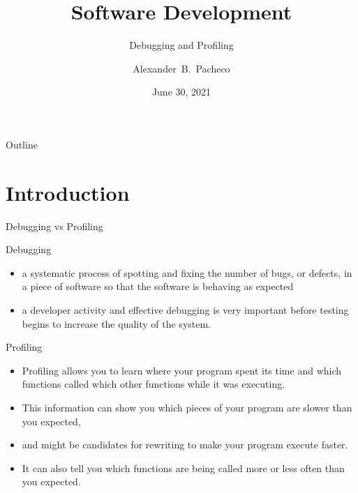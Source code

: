 \documentclass[10pt,t]{beamer}
\title{Software Development}
\subtitle{Debugging and Profiling}
\author[Alex Pacheco]{\large{Alexander~B.~Pacheco}}
\institute{\href{http://researchcomputing.lehigh.edu}{Research Computing}}
\date{June 30, 2021}
\begin{document}
\frame{\titlepage}

\begin{frame}{Outline}
  \tableofcontents
\end{frame}

\section{Introduction}
\begin{frame}{Debugging vs Profiling}
  \begin{eblock}{Debugging}
    \begin{itemize}
    \item a systematic process of spotting and fixing the number of bugs, or defects, in a piece of software so that the software is behaving as expected
    \item a developer activity and effective debugging is very important before testing begins to increase the quality of the system.
    \end{itemize}
  \end{eblock}

  \begin{eblock}{Profiling}
    \begin{itemize}
    \item Profiling allows you to learn where your program spent its time and which functions called which other functions while it was executing.
    \item This information can show you which pieces of your program are slower than you expected, 
    \item[] and might be candidates for rewriting to make your program execute faster. 
    \item It can also tell you which functions are being called more or less often than you expected.
    \end{itemize}
  \end{eblock}
\end{frame}
\end{document}
